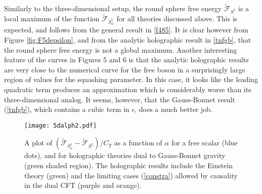 \documentclass[12pt]{article}
\numberwithin{equation}{section}
\newcommand{\req}[1]{(\ref{#1})} %
\newcommand{\ssc}{\scriptscriptstyle}
\newcommand{\ctt}{C_{\ssc T}}
\begin{document}
 Similarly to the three-dimensional setup, the round sphere free energy $\tilde{\mathcal{F}}_{S^5}$ is a local maximum of the function $\tilde{\mathcal{F}}_{S^5_{\alpha}}$ for all theories discussed above. This is expected, and follows from the general result in  \eqref{f485}. It is clear however from Figure \ref{fig:F5depsilon}, and from the analytic holographic result in \eqref{tnfgb}, that the round sphere free energy is not a global maximum. Another interesting feature of the curves in Figures 5 and 6 is that the analytic holographic results are very close to the numerical curve for the free boson in a surprisingly large region of values for the squashing parameter. In this case, it looks like the leading quadratic term produces an approximation which is considerably worse than its three-dimensional analog. It seems, however, that the Gauss-Bonnet result \req{tnfgb}, which contains a cubic term in $\epsilon$, does a much better job.
 
 
 \begin{figure}[H]
 	\centering
 	
 	\texttt{[image: 5dalph2.pdf]}
 	
 	\caption{A plot of $(\tilde{\mathcal{F}}_{S^5_{\alpha}}-\tilde{\mathcal{F}}_{S^5})/\ctt$ as a function of $\alpha$ for a free scalar (blue dots), and for holographic theories dual to Gauss-Bonnet gravity (green shaded region). The holographic results include the Einstein theory (green) and the limiting cases \req{constra} allowed by causality in the dual CFT (purple and orange). }\label{fig:F5dalpha}
 \end{figure}
 
\end{document}
